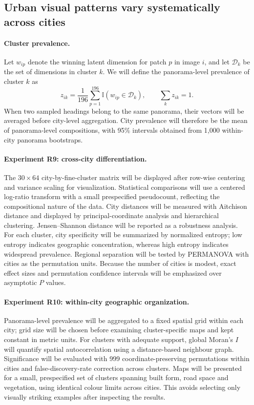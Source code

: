 \subsection{Urban visual patterns vary systematically across cities}
\label{sec:results_cities}

\paragraph{Cluster prevalence.}
Let $w_{ip}$ denote the winning latent dimension for patch $p$ in image $i$,
and let $\mathcal{D}_k$ be the set of dimensions in cluster $k$. We will define
the panorama-level prevalence of cluster $k$ as
\begin{equation}
  z_{ik}=\frac{1}{196}\sum_{p=1}^{196}
  \mathbb{I}\!\left(w_{ip}\in\mathcal{D}_k\right),
  \qquad \sum_k z_{ik}=1.
  \label{eq:cluster_prevalence}
\end{equation}
When two sampled headings belong to the same panorama, their vectors will be
averaged before city-level aggregation. City prevalence will therefore be the
mean of panorama-level compositions, with 95\% intervals obtained from 1,000
within-city panorama bootstraps.

\paragraph{Experiment R9: cross-city differentiation.}
The $30\times64$ city-by-fine-cluster matrix will be displayed after row-wise
centering and variance scaling for visualization. Statistical comparisons will
use a centered log-ratio transform with a small prespecified pseudocount,
reflecting the compositional nature of the data. City distances will be measured
with Aitchison distance and displayed by principal-coordinate analysis and
hierarchical clustering. Jensen--Shannon distance will be reported as a
robustness analysis. For each cluster, city specificity will be summarized by
normalized entropy; low entropy indicates geographic concentration, whereas
high entropy indicates widespread prevalence. Regional separation will be
tested by PERMANOVA with cities as the permutation units. Because the number of
cities is modest, exact effect sizes and permutation confidence intervals will
be emphasized over asymptotic $P$ values.

\paragraph{Experiment R10: within-city geographic organization.}
Panorama-level prevalence will be aggregated to a fixed spatial grid within
each city; grid size will be chosen before examining cluster-specific maps and
kept constant in metric units. For clusters with adequate support, global
Moran's $I$ will quantify spatial autocorrelation using a distance-based
neighbour graph. Significance will be evaluated with 999 coordinate-preserving
permutations within cities and false-discovery-rate correction across clusters.
Maps will be presented for a small, prespecified set of clusters spanning built
form, road space and vegetation, using identical colour limits across cities.
This avoids selecting only visually striking examples after inspecting the
results.


